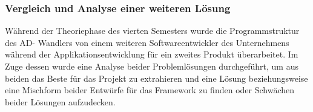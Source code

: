 \subsubsection{Vergleich und Analyse einer weiteren Lösung}
\label{subsubsec:analysis}
Während der Theoriephase des vierten Semesters wurde die Programmstruktur des AD- Wandlers von einem weiteren Softwareentwickler des Unternehmens während der Applikationsentwicklung für ein zweites Produkt überarbeitet.
Im Zuge dessen wurde eine Analyse beider Problemlösungen durchgeführt, um aus beiden das Beste für das Projekt zu extrahieren und eine Lösung beziehungsweise eine Mischform beider Entwürfe für das Framework zu finden oder Schwächen beider Lösungen aufzudecken.
